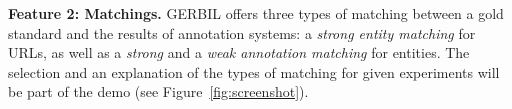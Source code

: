 

\textbf{Feature 2: Matchings.}
GERBIL offers three types of matching between a gold standard and the results of annotation systems: a \emph{strong entity matching} for URLs, as well as a  \emph{strong} and a \emph{weak annotation matching} for entities.
The selection and an explanation of the types of matching for given experiments will be part of the demo (see Figure~\ref{fig:screenshot}). %

